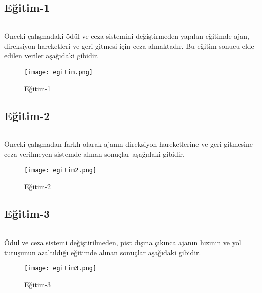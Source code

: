 \documentclass{article}
\begin{document}
\newpage

\subsection{Eğitim-1}
\rule{\textwidth}{0.5pt}
\par Önceki çalışmadaki ödül ve ceza sistemini değiştirmeden yapılan eğitimde ajan, direksiyon hareketleri ve geri gitmesi için ceza almaktadır. Bu eğitim sonucu elde edilen veriler aşağıdaki gibidir.\\[5pt]

\begin{figure}[h]
    \begin{center}
        \texttt{[image: egitim.png]}
    \end{center}
      \caption{Eğitim-1}
\end{figure}

\subsection{Eğitim-2}
\rule{\textwidth}{0.5pt}
\par Önceki çalışmadan farklı olarak ajanın direksiyon hareketlerine ve geri gitmesine ceza verilmeyen sistemde alınan sonuçlar aşağıdaki gibidir.

\begin{figure}[h]
    \begin{center}
        \texttt{[image: egitim2.png]}
    \end{center}
      \caption{Eğitim-2}
\end{figure}


\subsection{Eğitim-3}
\rule{\textwidth}{0.5pt}
\par Ödül ve ceza sistemi değiştirilmeden, pist dışına çıkınca ajanın hızının ve yol tutuşunun azaltıldığı eğitimde alınan sonuçlar aşağıdaki gibidir.\\[5pt]

\begin{figure}[h]
    \begin{center}
        \texttt{[image: egitim3.png]}
    \end{center}
      \caption{Eğitim-3}
\end{figure}

\vspace{1cm}
\end{document}
